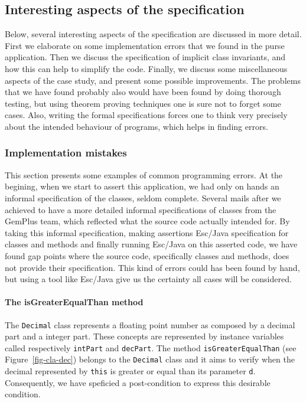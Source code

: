 \documentclass[a4paper]{llncs}
\begin{document}
\subsection{Interesting aspects of the specification}\label{SectSpecDetails}
Below, several interesting aspects of the specification are discussed
in more detail. First we elaborate on some implementation errors
that we found in the purse application.  Then we discuss the
specification of implicit class invariants, and how this can help to
simplify the code. Finally, we discuss some miscellaneous aspects of
the case study, and present some possible improvements. The problems
that we have found probably also would have been found by doing
thorough testing, but using theorem proving techniques one is sure not
to forget some cases. Also, writing the formal specifications forces
one to think very precisely about the intended behaviour of programs,
which helps in finding errors. 






\subsubsection{Implementation mistakes}
This section presents some examples of common programming
errors. At the begining, when we start to assert this application, we
had only on hands an informal specification of the classes, seldom
complete. Several mails after we achieved to have a more detailed informal
specifications of classes from the GemPlus team, which reflected what
the source code actually intended for. By taking this informal
specification, making assertions Esc/Java specification for classes
and methods and finally running Esc/Java on this asserted code, we
have found gap points where the source code, specifically classes and
methods, does not provide their specification. This kind of errors
could has been found by hand, but using a tool like Esc/Java give us
the certainty all cases will be considered.




\paragraph{The isGreaterEqualThan method}

The \texttt{Decimal} class
represents a floating point number as
composed by a decimal part and a integer part. These concepts are
represented by instance variables called respectively \texttt{intPart}
and \texttt{decPart}. The
method \texttt{isGreaterEqualThan} (see Figure~\ref{fig-cla-dec})
belongs to the \texttt{Decimal} class and it aims to verify when the
decimal represented by \texttt{this} is greater or equal than its parameter
\texttt{d}. Consequently, we have speficied a post-condition to express
this desirable condition.
\end{document}
